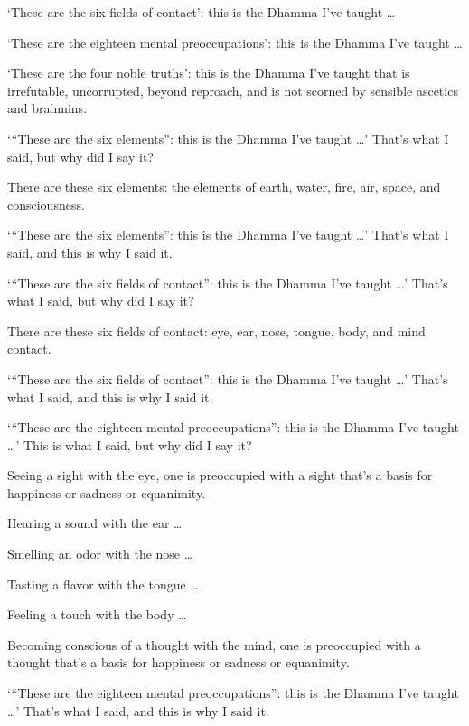 \documentclass[12pt,openany]{book}%
\begin{document}
‘These are the six fields of contact’: this is the Dhamma I’ve taught … 

‘These are the eighteen mental preoccupations’: this is the Dhamma I’ve taught … 

‘These are the four noble truths’: this is the Dhamma I’ve taught that is irrefutable, uncorrupted, beyond reproach, and is not scorned by sensible ascetics and brahmins. 

‘“These are the six elements”: this is the Dhamma I’ve taught …’ That’s what I said, but why did I say it? 

There are these six elements: the elements of earth, water, fire, air, space, and consciousness. 

‘“These are the six elements”: this is the Dhamma I’ve taught …’ That’s what I said, and this is why I said it. 

‘“These are the six fields of contact”: this is the Dhamma I’ve taught …’ That’s what I said, but why did I say it? 

There are these six fields of contact: eye, ear, nose, tongue, body, and mind contact. 

‘“These are the six fields of contact”: this is the Dhamma I’ve taught …’ That’s what I said, and this is why I said it. 

‘“These are the eighteen mental preoccupations”: this is the Dhamma I’ve taught …’ This is what I said, but why did I say it? 

Seeing a sight with the eye, one is preoccupied with a sight that’s a basis for happiness or sadness or equanimity. 

Hearing a sound with the ear … 

Smelling an odor with the nose … 

Tasting a flavor with the tongue … 

Feeling a touch with the body … 

Becoming conscious of a thought with the mind, one is preoccupied with a thought that’s a basis for happiness or sadness or equanimity. 

‘“These are the eighteen mental preoccupations”: this is the Dhamma I’ve taught …’ That’s what I said, and this is why I said it. 
\end{document}
